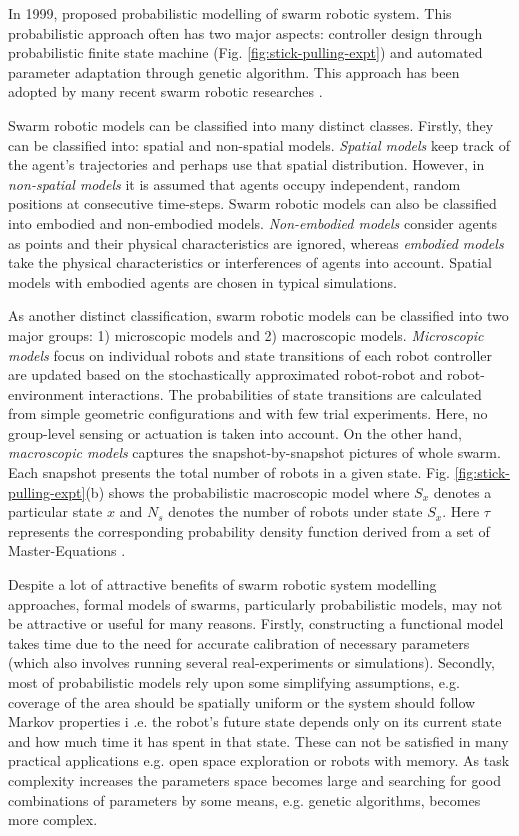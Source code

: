 In 1999,  proposed probabilistic modelling of swarm robotic system. This probabilistic approach often has two major aspects: controller design through probabilistic finite state machine (Fig. \ref{fig:stick-pulling-expt}) and automated parameter adaptation through genetic algorithm. This approach has been adopted by many recent swarm robotic researches \cite{Agassounon+2004,Lerman+2005,Liu+2007b}.
 
Swarm robotic models can be classified into many distinct classes. Firstly, they can be classified into: spatial and non-spatial models. {\em Spatial models} keep track of the agent's trajectories and perhaps use that spatial distribution. However, in {\em non-spatial models} it is assumed that agents occupy independent, random positions at consecutive time-steps. Swarm robotic models can also be classified into embodied and non-embodied models. {\em Non-embodied models} consider agents  as points and their physical characteristics are ignored, whereas {\em embodied models} take the physical characteristics or interferences of agents into account. Spatial models with embodied agents are chosen in typical simulations.

As another distinct classification, swarm robotic models can be classified into two major groups: 1) microscopic models and 2) macroscopic models. {\em Microscopic models} focus on individual robots and state transitions of each robot controller are updated based on the stochastically approximated robot-robot and robot-environment interactions. The probabilities of state transitions are calculated from simple geometric configurations and with few trial experiments. Here, no group-level sensing or actuation is taken into account. On the other hand, {\em macroscopic models} captures the snapshot-by-snapshot pictures of whole swarm. Each snapshot presents the total number of robots in a given state. Fig. \ref{fig:stick-pulling-expt}(b) shows the probabilistic macroscopic model where $S_{x}$ denotes a particular state $x$ and $N_{s}$ denotes the number of robots under state $S_{x}$. Here $\tau$ represents the corresponding probability density function derived from a set of Master-Equations \cite{Agassounon+2004}.

Despite a lot of attractive benefits of swarm robotic system modelling approaches, formal models of swarms, particularly probabilistic models, may not be attractive or useful for many reasons. Firstly, constructing a functional model takes time due to the need for accurate calibration of necessary parameters (which also involves running several real-experiments or simulations). 
Secondly, most of probabilistic models rely upon some simplifying assumptions, e.g. coverage of the area should be spatially uniform or the system should follow Markov properties i .e. the robot's future state depends only on its current state and how much time it has spent in that state. These can not be satisfied in many practical applications e.g. open space exploration or robots with memory. As task complexity increases the parameters space becomes large and searching for good combinations of parameters by some means, e.g. genetic algorithms, becomes more complex.

